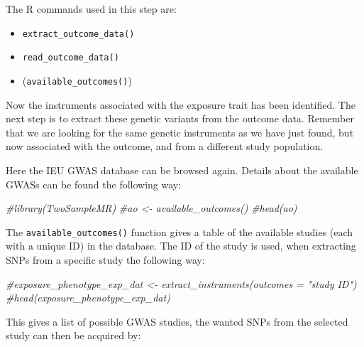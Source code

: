 \documentclass[
]{article}
\newenvironment{Shaded}{\begin{snugshade}}{\end{snugshade}}
\newcommand{\CommentTok}[1]{\textcolor[rgb]{0.56,0.35,0.01}{\textit{#1}}}
\providecommand{\tightlist}{%
  \setlength{\itemsep}{0pt}\setlength{\parskip}{0pt}}
\begin{document}
The R commands used in this step are:

\begin{itemize}
\tightlist
\item
  \texttt{extract\_outcome\_data()}
\item
  \texttt{read\_outcome\_data()}
\item
  (\texttt{available\_outcomes()})
\end{itemize}

Now the instruments associated with the exposure trait has been
identified. The next step is to extract these genetic variants from the
outcome data. Remember that we are looking for the same genetic
instruments as we have just found, but now associated with the outcome,
and from a different study population.

Here the IEU GWAS database can be browsed again. Details about the
available GWASs can be found the following way:

\begin{Shaded}
\begin{Highlighting}[]
\CommentTok{\#library(TwoSampleMR)}
\CommentTok{\#ao \textless{}{-} available\_outcomes()}
\CommentTok{\#head(ao)}
\end{Highlighting}
\end{Shaded}

The \texttt{available\_outcomes()} function gives a table of the
available studies (each with a unique ID) in the database. The ID of the
study is used, when extracting SNPs from a specific study the following
way:

\begin{Shaded}
\begin{Highlighting}[]
\CommentTok{\#exposure\_phenotype\_exp\_dat \textless{}{-} extract\_instruments(outcomes = "study ID")}
\CommentTok{\#head(exposure\_phenotype\_exp\_dat)}
\end{Highlighting}
\end{Shaded}

\begin{Shaded}
\end{Shaded}

This gives a list of possible GWAS studies, the wanted SNPs from the
selected study can then be acquired by:

\begin{Shaded}
\end{Shaded}
\end{document}
